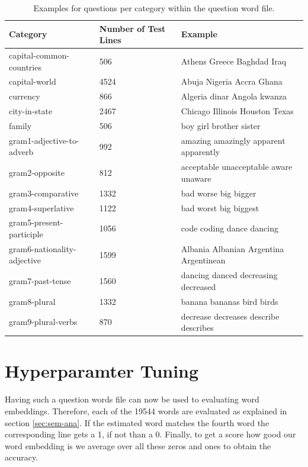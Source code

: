 \begin{center}
\begin{table}[!h]
\begin{tabular}{ l | R{2.5cm} | l }
\hline
\textbf{Category} & \textbf{Number of Test Lines} & \textbf{Example}\\
\hline\hline
capital-common-countries & 506 & Athens Greece Baghdad Iraq\\
\hline
capital-world & 4524 & Abuja Nigeria Accra Ghana\\
\hline
currency & 866 & Algeria dinar Angola kwanza\\
\hline
city-in-state & 2467 & Chicago Illinois Houston Texas\\
\hline
family & 506 & boy girl brother sister\\
\hline
gram1-adjective-to-adverb & 992 & amazing amazingly apparent apparently\\
\hline
gram2-opposite & 812 & acceptable unacceptable aware unaware\\
\hline
gram3-comparative & 1332 & bad worse big bigger\\
\hline
gram4-superlative & 1122 & bad worst big biggest\\
\hline
gram5-present-participle & 1056 & code coding dance dancing\\
\hline
gram6-nationality-adjective & 1599 & Albania Albanian Argentina Argentinean\\
\hline
gram7-past-tense & 1560 & dancing danced decreasing decreased\\
\hline
gram8-plural & 1332 & banana bananas bird birds\\
\hline
gram9-plural-verbs & 870 & decrease decreases describe describes\\
\hline
\end{tabular}
\caption{Examples for questions per category within the question word file.}
\label{tab:qwfile}
\end{table}
\end{center}

\section{Hyperparamter Tuning}

Having such a question words file can now be used to evaluating word embeddings.
Therefore, each of the 19544 words are evaluated as explained in section 
\ref{sec:sem-ana}. If the estimated word matches the fourth word the corresponding 
line gets a 1, if not than a 0. Finally, to get a score how good our word embedding
is we average over all these zeros and ones to obtain the accuracy.\\

